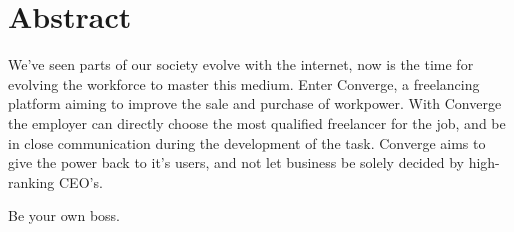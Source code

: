 \chapter{Abstract}

We've seen parts of our society evolve with the internet, now is the time for evolving the workforce to master this medium. Enter Converge, a freelancing platform aiming to improve the sale and purchase of workpower. With Converge the employer can directly choose the most qualified freelancer for the job, and be in close communication during the development of the task. Converge aims to give the power back to it's users, and not let business be solely decided by high-ranking CEO's. 

Be your own boss.